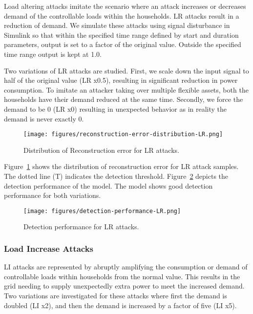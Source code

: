 Load altering attacks imitate the scenario where an attack increases or decreases demand of the controllable loads within the households. LR attacks result in a reduction of demand. We simulate these attacks using signal disturbance in Simulink so that within the specified time range defined by start and duration parameters, output is set to a factor of the original value. Outside the specified time range output is kept at 1.0. 

Two variations of LR attacks are studied. First, we scale down the input signal to half of the original value (LR x0.5), resulting in significant reduction in power consumption. To imitate an attacker taking over multiple flexible assets, both the households have their demand reduced at the same time. Secondly, we force the demand to be 0 (LR x0) resulting in unexpected behavior as in reality the demand is never exactly 0. 
 

\begin{figure}[htbp!] 
    \centering 
    \texttt{[image: figures/reconstruction-error-distribution-LR.png]}
    \caption{Distribution of Reconstruction error for LR attacks.}
    \centering
    \label{fig:LR1}
\end{figure}

Figure~\ref{fig:LR1} shows the distribution of reconstruction error for LR attack samples. The dotted line (T) indicates the detection threshold. Figure~\ref{fig:LR2} depicts the detection performance of the model. The model shows good detection performance for both variations. 

\begin{figure}[htbp!] 
    \centering 
    \texttt{[image: figures/detection-performance-LR.png]}
    \caption{Detection performance for LR attacks.}
    \centering
    \label{fig:LR2}
\end{figure}



\subsubsection{Load Increase Attacks}

LI attacks are represented by abruptly amplifying the consumption or demand of controllable loads within households from the normal value. This results in the grid needing to supply unexpectedly extra power to meet the increased demand. Two variations are investigated for these attacks where first the demand is doubled (LI x2), and then the demand is increased by a factor of five (LI x5).  


